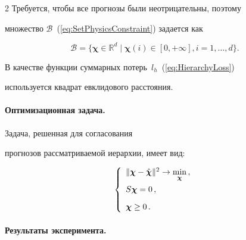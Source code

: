 \begin{multicols}{2}
Требуется, чтобы все прогнозы были неотрицательны, поэтому

множество $\mathcal{B}$~(\ref{eq:SetPhysicsConstraint}) задается как

$$

    \mathcal{B} = \{ \boldsymbol{\chi} \in \mathbb{R}^d \mid \boldsymbol{\chi}(i) \in [0, +\infty], i = 1, \ldots, d

    \}.

$$







В качестве функции суммарных потерь~$l_h$~(\ref{eq:HierarchyLoss})

используется квадрат евклидового расстояния.







\paragraph*{Оптимизационная задача.} Задача, решенная для согласования

прогнозов рассматриваемой иерархии, имеет вид:



\columnbreak





\noindent

$$

    \left\{%

\begin{array}{l}

    \| \boldsymbol{\chi} - \hchi \|^2 \rightarrow \min\limits_{\boldsymbol{\chi}}\,,  \\[9pt]

    S \boldsymbol{\chi} = 0\,,  \\[9pt]

    \boldsymbol{\chi} \geq 0\,.

\end{array}%

\right.

$$





\paragraph*{Результаты эксперимента.}


\end{multicols}
